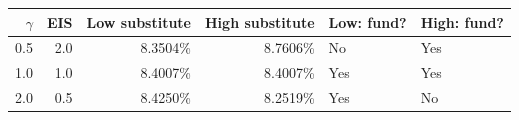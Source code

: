 \begin{tabular}{rrrrll}
\toprule
$\gamma$ & EIS & Low substitute & High substitute & Low: fund? & High: fund?\\
\midrule
0.5 & 2.0 & 8.3504\% & 8.7606\% & No & Yes \\
1.0 & 1.0 & 8.4007\% & 8.4007\% & Yes & Yes \\
2.0 & 0.5 & 8.4250\% & 8.2519\% & Yes & No \\
\bottomrule
\end{tabular}
